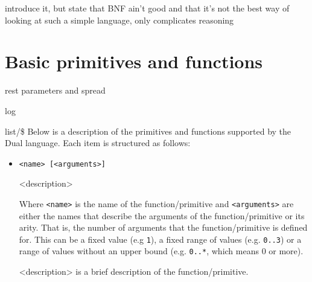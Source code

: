     introduce it, but state that BNF ain't good and that it's not the best way of looking at such a simple language, only complicates reasoning

 \section{Basic primitives and functions}\label{sec:primitives}
 
 {}
 rest parameters and spread
 
 log
 
 list/\$
Below is a description of the primitives and functions supported by the Dual language. Each item is structured as follows:
\begin{itemize}
    \item \texttt{<name> [<arguments>]}
    
    <description>
    
    Where \texttt{<name>} is the name of the function/primitive and \texttt{<arguments>} are either the names that describe the arguments of the function/primitive or its arity. That is, the number of arguments that the function/primitive is defined for. This can be a fixed value (e.g \texttt{1}), a fixed range of values (e.g. \texttt{0..3}) or a range of values without an upper bound (e.g. \texttt{0..*}, which means 0 or more).
    
    <description> is a brief description of the function/primitive.
\end{itemize}

